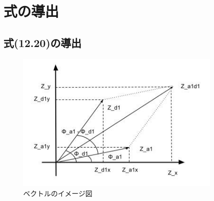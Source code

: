 \documentclass[fleqn,11pt,a4paper,dvipdfmx]{jsarticle}
\numberwithin{equation}{section}
\begin{document}
\setcounter{section}{1}
\setcounter{figure}{0}
\section*{式の導出}
\subsection*{式(12.20)の導出}
\begin{figure}[b]
  \begin{center}
    \includegraphics[width=100mm]{./img/vector_Z.jpg}
    \caption{ベクトルのイメージ図}
    \label{vector_Z}
  \end{center}
\end{figure}
\end{document}
